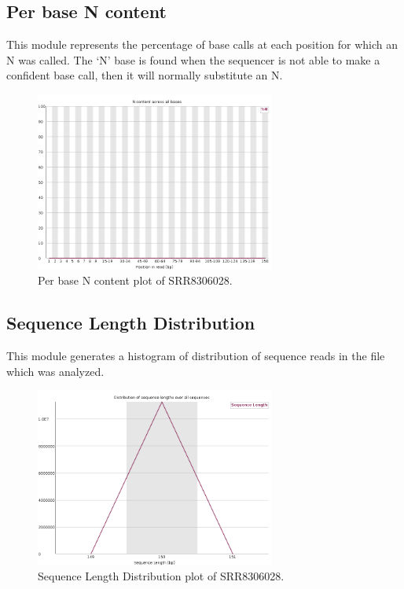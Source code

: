 \documentclass[
  letterpaper,
  DIV=11,
  numbers=noendperiod]{scrreprt}
\begin{document}
\hypertarget{per-base-n-content}{%
\subsection{Per base N content}\label{per-base-n-content}}

This module represents the percentage of base calls at each position for
which an N was called. The `N' base is found when the sequencer is not
able to make a confident base call, then it will normally substitute an
N.

\begin{figure}

{\centering \includegraphics[width=0.7\textwidth,height=\textheight]{./assets/26_fqc_N.png}

}

\caption{Per base N content plot of SRR8306028.}

\end{figure}

\hypertarget{sequence-length-distribution}{%
\subsection{Sequence Length
Distribution}\label{sequence-length-distribution}}

This module generates a histogram of distribution of sequence reads in
the file which was analyzed.

\begin{figure}

{\centering \includegraphics[width=0.7\textwidth,height=\textheight]{./assets/27_fqc_len_dist.png}

}

\caption{Sequence Length Distribution plot of SRR8306028.}

\end{figure}
\end{document}
